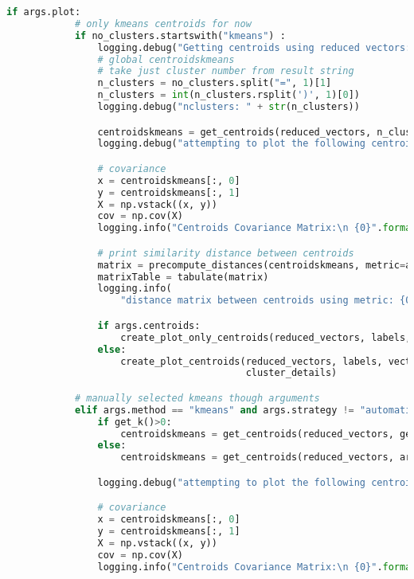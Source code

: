 \begin{lstlisting}[language=python]
        if args.plot:
            # only kmeans centroids for now
            if no_clusters.startswith("kmeans") :
                logging.debug("Getting centroids using reduced vectors:")
                # global centroidskmeans
                # take just cluster number from result string
                n_clusters = no_clusters.split("=", 1)[1]
                n_clusters = int(n_clusters.rsplit(')', 1)[0])
                logging.debug("nclusters: " + str(n_clusters))

                centroidskmeans = get_centroids(reduced_vectors, n_clusters)
                logging.debug("attempting to plot the following centroids:\n " + str(centroidskmeans))

                # covariance
                x = centroidskmeans[:, 0]
                y = centroidskmeans[:, 1]
                X = np.vstack((x, y))
                cov = np.cov(X)
                logging.info("Centroids Covariance Matrix:\n {0}".format(cov))

                # print similarity distance between centroids
                matrix = precompute_distances(centroidskmeans, metric=args.metric)
                matrixTable = tabulate(matrix)
                logging.info(
                    "distance matrix between centroids using metric: {0} :\n{1}".format(args.metric, matrixTable))

                if args.centroids:
                    create_plot_only_centroids(reduced_vectors, labels, vector_names, centroidskmeans, n_clusters)
                else:
                    create_plot_centroids(reduced_vectors, labels, vector_names, centroidskmeans, n_clusters,
                                          cluster_details)

            # manually selected kmeans though arguments
            elif args.method == "kmeans" and args.strategy != "automatic":
                if get_k()>0:
                    centroidskmeans = get_centroids(reduced_vectors, get_k())
                else:
                    centroidskmeans = get_centroids(reduced_vectors, args.n_clusters)

                logging.debug("attempting to plot the following centroids: \n" + str(centroidskmeans))

                # covariance
                x = centroidskmeans[:, 0]
                y = centroidskmeans[:, 1]
                X = np.vstack((x, y))
                cov = np.cov(X)
                logging.info("Centroids Covariance Matrix:\n {0}".format(cov))


\end{lstlisting}
